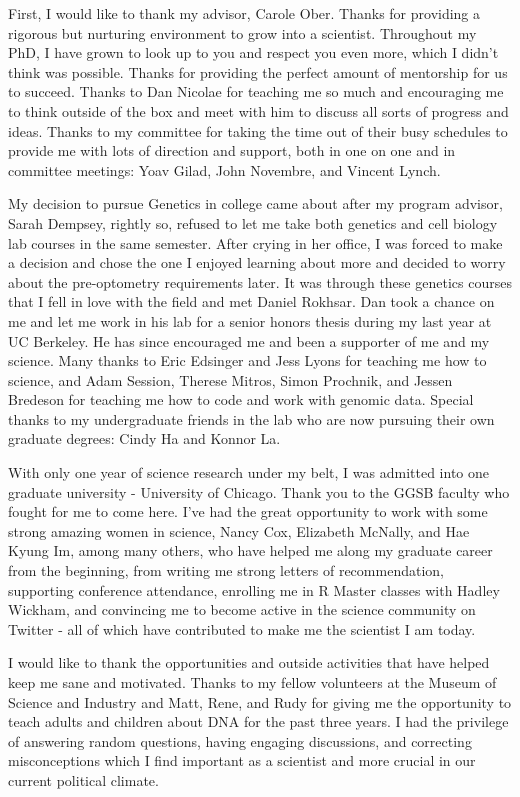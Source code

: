 \acknowledgments

First, I would like to thank my advisor, Carole Ober. Thanks for providing a rigorous but nurturing environment to grow into a scientist. Throughout my PhD, I have grown to look up to you and respect you even more, which I didn't think was possible. Thanks for providing the perfect amount of mentorship for us to succeed. Thanks to Dan Nicolae for teaching me so much and encouraging me to think outside of the box and meet with him to discuss all sorts of progress and ideas. Thanks to my committee for taking the time out of their busy schedules to provide me with lots of direction and support, both in one on one and in committee meetings: Yoav Gilad, John Novembre, and Vincent Lynch.  

My decision to pursue Genetics in college came about after my program advisor, Sarah Dempsey, rightly so, refused to let me take both genetics and cell biology lab courses in the same semester. After crying in her office, I was forced to make a decision and chose the one I enjoyed learning about more and decided to worry about the pre-optometry requirements later. It was through these genetics courses that I fell in love with the field and met Daniel Rokhsar. Dan took a chance on me and let me work in his lab for a senior honors thesis during my last year at UC Berkeley. He has since encouraged me and been a supporter of me and my science. Many thanks to Eric Edsinger and Jess Lyons for teaching me how to science, and Adam Session, Therese Mitros, Simon Prochnik, and Jessen Bredeson for teaching me how to code and work with genomic data. Special thanks to my undergraduate friends in the lab who are now pursuing their own graduate degrees: Cindy Ha and Konnor La. 

With only one year of science research under my belt, I was admitted into one graduate university - University of Chicago. Thank you to the GGSB faculty who fought for me to come here. I've had the great opportunity to work with some strong amazing women in science, Nancy Cox, Elizabeth McNally, and Hae Kyung Im, among many others, who have helped me along my graduate career from the beginning, from writing me strong letters of recommendation, supporting conference attendance, enrolling me in R Master classes with Hadley Wickham, and convincing me to become active in the science community on Twitter - all of which have contributed to make me the scientist I am today.

I would like to thank the opportunities and outside activities that have helped keep me sane and motivated. Thanks to my fellow volunteers at the Museum of Science and Industry and Matt, Rene, and Rudy for giving me the opportunity to teach adults and children about DNA for the past three years. I had the privilege of answering random questions, having engaging discussions, and correcting misconceptions which I find important as a scientist and more crucial in our current political climate.

